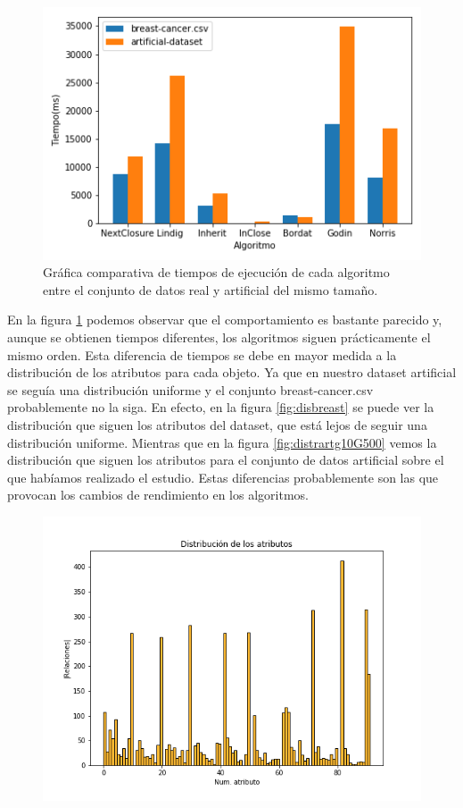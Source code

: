 \documentclass[oneside,openright,titlepage,numbers=noenddot,openany,headinclude,footinclude=true,
cleardoublepage=empty,abstractoff,BCOR=5mm,paper=a4,fontsize=12pt,main=spanish]{scrreprt}
\begin{document}
\begin{itemize}
\begin{figure}[H]
  \centering
  \includegraphics[scale=0.6]{images/comparative-breast.png}
\caption{Gráfica comparativa de tiempos de ejecución de cada algoritmo entre el conjunto de datos real y artificial del mismo tamaño. }
\label{fig:compbreast}
\end{figure}

En la figura \ref{fig:compbreast} podemos observar que el comportamiento es bastante parecido y, aunque se obtienen tiempos diferentes, los algoritmos siguen prácticamente el mismo orden. Esta diferencia de tiempos se debe en mayor medida a la distribución de los atributos para cada objeto. Ya que en nuestro dataset artificial se seguía una distribución uniforme y el conjunto breast-cancer.csv probablemente no la siga. En efecto, en la figura \ref{fig:disbreast} se puede ver la distribución que siguen los atributos del dataset, que está lejos de seguir una distribución uniforme. Mientras que en la figura \ref{fig:distrartg10G500} vemos la distribución que siguen los atributos para el conjunto de datos artificial sobre el que habíamos realizado el estudio. Estas diferencias probablemente son las que provocan los cambios de rendimiento en los algoritmos.

\begin{figure}[H]
  \centering
  \includegraphics[scale=0.5]{images/distribution-breast.png}
 

\end{figure}
\end{itemize}
\end{document}

